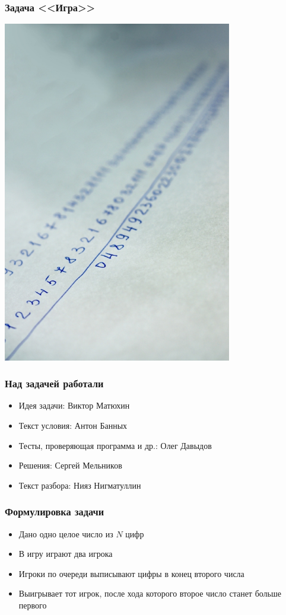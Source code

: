 \begin{frame}
  \frametitle{Задача <<Игра>>}
  \begin{center}
    \includegraphics[width=10cm]{game-11.eps}
  \end{center}
\end{frame}

\begin{frame}
  \frametitle{Над задачей работали}
  \begin{itemize}
    \item Идея задачи: Виктор Матюхин
    \item Текст условия: Антон Банных
    \item Тесты, проверяющая программа и др.: Олег Давыдов
    \item Решения: Сергей Мельников
    \item Текст разбора: Нияз Нигматуллин
  \end{itemize}
\end{frame}

\begin{frame}
  \frametitle{Формулировка задачи}
  \begin{itemize}
    \item
      Дано одно целое число из $N$ цифр
    \item
      В игру играют два игрока
    \item
    	Игроки по очереди выписывают цифры в конец второго числа
    \item
    	Выигрывает тот игрок, после хода которого второе число станет больше первого
  \end{itemize}
\end{frame}

